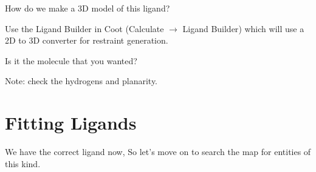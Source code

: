 \documentclass{article}
\begin{document}
\begin{trivlist}
\item  How do we make a 3D model of this ligand?

\textsf{Use the Ligand Builder in Coot (\textsf{Calculate $\rightarrow$ Ligand Builder}) which will use a 2D to 3D converter for restraint generation.}

\end{trivlist}








\begin{trivlist}
\item Is it the molecule that you wanted?

 \textsf{Note: check the hydrogens and planarity.}
 \end{trivlist}



\section{Fitting Ligands}

We have the correct ligand now, So let's move on to search the map for
entities of this kind.
\end{document}
